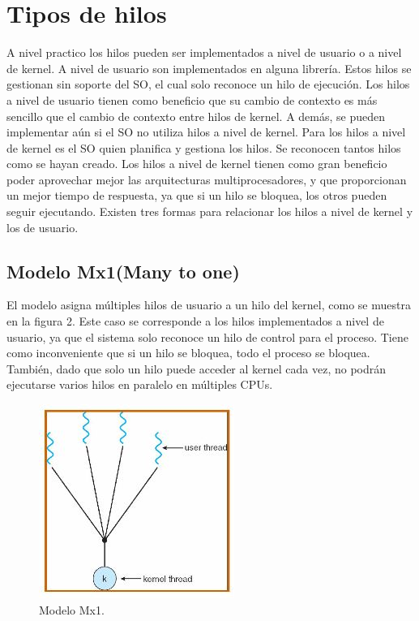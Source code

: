 \documentclass{article}
\begin{document}
\section{Tipos de hilos}
A nivel practico los hilos pueden ser implementados a nivel de usuario o a nivel de kernel.
A nivel de usuario son implementados en alguna librería. Estos hilos se gestionan sin soporte del SO, el cual solo reconoce un hilo de ejecución. Los hilos a nivel de usuario tienen como beneficio que su cambio de contexto es más sencillo que el cambio de contexto entre hilos de kernel. A demás, se pueden implementar aún si el SO no utiliza hilos a nivel de kernel.
Para los hilos a nivel de kernel es el SO quien planifica y gestiona los hilos. Se reconocen tantos hilos como se hayan creado. Los hilos a nivel de kernel tienen como gran beneficio poder aprovechar mejor las arquitecturas multiprocesadores, y que proporcionan un mejor tiempo de respuesta, ya que si un hilo se bloquea, los otros pueden seguir ejecutando.
Existen tres formas para relacionar los hilos a nivel de kernel y los de usuario.\cite{hker}

\subsection{Modelo Mx1(Many to one)}
El modelo asigna múltiples hilos de usuario a un hilo del kernel, como se muestra en la figura 2. Este caso se corresponde a los hilos implementados a nivel de usuario, ya que el sistema solo reconoce un hilo de control para el proceso.  Tiene como inconveniente que si un hilo se bloquea, todo el proceso se bloquea. También, dado que solo un hilo puede acceder al kernel cada vez, no podrán ejecutarse varios hilos en paralelo en múltiples CPUs.

\begin{figure}[h!]
\centering
\includegraphics[scale=0.7]{hilos1.JPG}
\caption{Modelo Mx1.\cite{hker}}
\label{fig:hilos1}
\end{figure}
\end{document}
